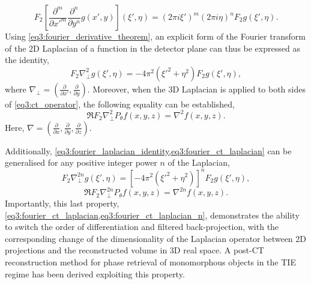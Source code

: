 \documentclass[twocolumn, switch]{article} %
\begin{document}
\begin{equation}
    \label{eq3:fourier_derivative_theorem}
    {F_2}\left[ {\frac{{{\partial ^m}}}{{\partial {{x'}^m}}}\frac{{{\partial ^n}}}{{\partial {y^n}}}g(x',y)} \right](\xi ',\eta ) = {\left( {2\pi i\xi '} \right)^m}{\left( {2\pi i\eta } \right)^n}{F_2}g(\xi ',\eta ).
\end{equation}
Using \cref{eq3:fourier_derivative_theorem}, an explicit form of the Fourier transform of the 2D Laplacian of a function in the detector plane can thus be expressed as the identity, 
\begin{equation}
    \label{eq3:fourier_laplacian_identity}
    {F_2}\nabla _ \bot ^2g(\xi ',\eta ) =  - 4{\pi ^2}\left( {{{\xi '}^2} + {\eta ^2}} \right){F_2}g(\xi ',\eta ),
\end{equation}
where ${\nabla _ \bot } = \left( {\frac{\partial }{{\partial x'}},\frac{\partial }{{\partial y}}} \right)$.
Moreover, when the 3D Laplacian is applied to both sides of \cref{eq3:ct_operator}, the following equality can be established,
\begin{equation}
    \label{eq3:fourier_ct_laplacian}
    \Re {F_2}\nabla _ \bot ^2{P_\theta }f(x,y,z) = {\nabla ^2}f(x,y,z).
\end{equation}
Here, $\nabla  = \left( {\frac{\partial }{{\partial x}},\frac{\partial }{{\partial y}},\frac{\partial }{{\partial z}}} \right)$.

Additionally, \cref{eq3:fourier_laplacian_identity,eq3:fourier_ct_laplacian} can be generalised for any positive integer power $n$ of the Laplacian,
\begin{equation}
    \label{eq3:fourier_laplacian_identity_n}
    {F_2}\nabla _ \bot ^{2n}g(\xi ',\eta ) = {\left[ { - 4{\pi ^2}\left( {{{\xi '}^2} + {\eta ^2}} \right)} \right]^n}{F_2}g(\xi ',\eta ),
\end{equation}
\begin{equation}
    \label{eq3:fourier_ct_laplacian_n}
    \Re {F_2}\nabla _ \bot ^{2n}{P_\theta }f(x,y,z) = \nabla^{2n}f(x,y,z).
\end{equation}
Importantly, this last property, \cref{eq3:fourier_ct_laplacian,eq3:fourier_ct_laplacian_n}, demonstrates the ability to switch the order of differentiation and filtered back-projection, with the corresponding change of the dimensionality of the Laplacian operator between 2D projections and the reconstructed volume in 3D real space. A post-CT reconstruction method for phase retrieval of monomorphous objects in the TIE regime has been derived \cite{Thompson2019FastTomography} exploiting this property.
\end{document}
